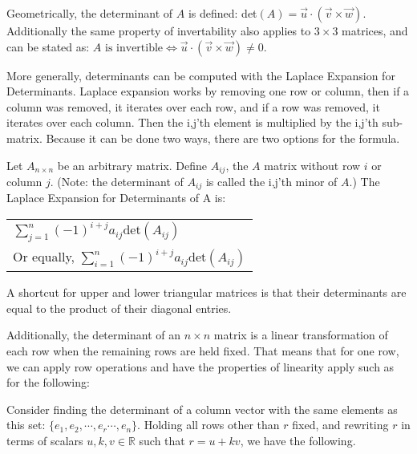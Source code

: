 \documentclass[11pt]{article}
\begin{document}
Geometrically, the determinant of $A$ is defined: det$(A)=\vec{u}\cdot(\vec{v}\times\vec{w})$. Additionally the same property of invertability also applies to $3\times 3$ matrices, and can be stated as: $A\text{ is invertible}\Leftrightarrow \vec{u}\cdot(\vec{v}\times\vec{w})\neq 0$.

More generally, determinants can be computed with the Laplace Expansion for Determinants. Laplace expansion works by removing one row or column, then if a column was removed, it iterates over each row, and if a row was removed, it iterates over each column. Then the i,j'th element is multiplied by the i,j'th sub-matrix. Because it can be done two ways, there are two options for the formula.

Let $A_{n\times n}$ be an arbitrary matrix. Define $A_{ij}$, the $A$ matrix without row $i$ or column $j$. (Note: the determinant of $A_{ij}$ is called the i,j'th minor of $A$.) The Laplace Expansion for Determinants of A is:

\begin{center}\begin{tabular}{l}
$\sum_{j=1}^n{(-1)^{i+j}a_{ij}\text{det}(A_{ij})}$\vspace{0.1cm}\\
Or equally, $\sum_{i=1}^n{(-1)^{i+j}a_{ij}\text{det}(A_{ij})}$
\end{tabular}\end{center}

A shortcut for upper and lower triangular matrices is that their determinants are equal to the product of their diagonal entries.

Additionally, the determinant of an $n\times n$ matrix is a linear transformation of each row when the remaining rows are held fixed. That means that for one row, we can apply row operations and have the properties of linearity apply such as for the following:

\newpage
Consider finding the determinant of a column vector with the same elements as this set: $\lbrace e_1,e_2,\cdots,e_r\cdots,e_n\rbrace$. Holding all rows other than $r$ fixed, and rewriting $r$ in terms of scalars $u,k,v\in\mathbb{R}$ such that $r=u+kv$, we have the following.
\end{document}
